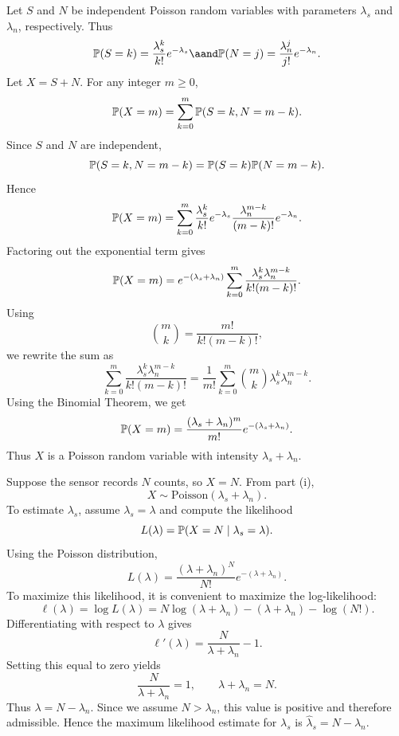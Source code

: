 \begin{solution}[(i)]
  Let $S$ and $N$ be independent Poisson random variables with parameters $\lambda_s$ and $\lambda_n$, respectively. Thus
  \[%
    \P(S = k) = \frac{\lambda_s^k}{k!}e^{-\lambda_s} \aand \P(N = j) = \frac{\lambda_n^j}{j!}e^{-\lambda_n}
  .\]%
  Let $X = S + N$. For any integer $m \ge 0$,
  \[%
    \P(X = m) = \sum_{k=0}^{m} \P(S = k, N = m - k)
  .\]%
  Since $S$ and $N$ are independent,
  \[%
    \P(S = k, N = m - k) = \P(S = k)\P(N = m - k)
  .\]%
  Hence
  \[%
    \P(X = m) = \sum_{k=0}^{m} \frac{\lambda_s^k}{k!}e^{-\lambda_s} \frac{\lambda_n^{m-k}}{(m - k)!}e^{-\lambda_n}
  .\]%
  Factoring out the exponential term gives
  \[%
    \P(X = m) = e^{-(\lambda_s+\lambda_n)} \sum_{k=0}^{m} \frac{\lambda_s^k\lambda_n^{m-k}}{k!(m - k)!}
  .\]%
  Using
  \[%
    \binom{m}{k} = \frac{m!}{k!(m-k)!}
  ,\]%
  we rewrite the sum as
  \[%
    \sum_{k=0}^{m} \frac{\lambda_s^k\lambda_n^{m-k}}{k!(m - k)!} = \frac{1}{m!} \sum_{k=0}^{m} \binom{m}{k}\lambda_s^k\lambda_n^{m-k}
  .\]%
  Using the Binomial Theorem, we get
  \[%
    \P(X = m) = \frac{(\lambda_s + \lambda_n)^m}{m!}e^{-(\lambda_s + \lambda_n)}
  .\]%
  Thus $X$ is a Poisson random variable with intensity $\lambda_s + \lambda_n$.
\end{solution}

\begin{solution}[(ii)]
  Suppose the sensor records $N$ counts, so $X=N$. From part (i),
  \[%
    X \sim \text{Poisson}(\lambda_s + \lambda_n)
  .\]%
  To estimate $\lambda_s$, assume $\lambda_s=\lambda$ and compute the likelihood
  \[%
    L(\lambda) = \P(X = N \mid \lambda_s = \lambda)
  .\]%
  Using the Poisson distribution,
  \[%
    L(\lambda) = \frac{(\lambda + \lambda_n)^N}{N!}e^{-(\lambda + \lambda_n)}
  .\]%
  To maximize this likelihood, it is convenient to maximize the log-likelihood:
  \[%
    \ell(\lambda) = \log L(\lambda) = N\log(\lambda + \lambda_n) - (\lambda + \lambda_n) - \log(N!)
  .\]%
  Differentiating with respect to $\lambda$ gives
  \[%
    \ell'(\lambda) = \frac{N}{\lambda + \lambda_n}-1
  .\]%
  Setting this equal to zero yields
  \[%
    \frac{N}{\lambda + \lambda_n} = 1, \qquad \lambda + \lambda_n = N
  .\]%
  Thus $\lambda = N - \lambda_n$. Since we assume $N>\lambda_n$, this value is positive and therefore admissible. Hence the maximum likelihood estimate for $\lambda_s$ is $\hat{\lambda}_s = N - \lambda_n$.
\end{solution}

